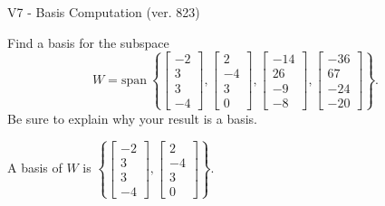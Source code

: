 \begin{exercise}
  \begin{exerciseTitle}V7 - Basis Computation (ver. 823)\end{exerciseTitle}
  \begin{exerciseStatement}
    Find a basis for the subspace 
\[W=\mathrm{span}\ \left\{\left[\begin{array}{r}
-2 \\
3 \\
3 \\
-4
\end{array}\right] , \left[\begin{array}{r}
2 \\
-4 \\
3 \\
0
\end{array}\right] , \left[\begin{array}{r}
-14 \\
26 \\
-9 \\
-8
\end{array}\right] , \left[\begin{array}{r}
-36 \\
67 \\
-24 \\
-20
\end{array}\right]\right\}.\]
 Be sure to explain why your result is a basis.


  \end{exerciseStatement}
  \begin{exerciseAnswer}
   A basis of \(W\) is  \(\left\{\left[\begin{array}{r}
-2 \\
3 \\
3 \\
-4
\end{array}\right] , \left[\begin{array}{r}
2 \\
-4 \\
3 \\
0
\end{array}\right]\right\}\).
  


  \end{exerciseAnswer}
\end{exercise}